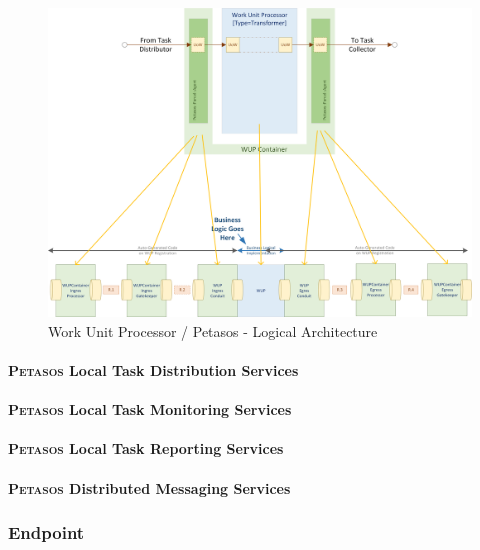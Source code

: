 \documentclass[a4paper]{book}
\begin{document}
\begin{figure}[h!]
	\begin{adjustbox}{max size={0.98\textwidth}{0.9\textheight}, center}
		\includegraphics[]{diagrams/Petasos-WUP.png}
	\end{adjustbox}
	\caption{Work Unit Processor / Petasos - Logical Architecture}
\end{figure}



\paragraph{\textsc{Petasos} Local Task Distribution Services}

\paragraph{\textsc{Petasos} Local Task Monitoring Services}

\paragraph{\textsc{Petasos} Local Task Reporting Services}

\paragraph{\textsc{Petasos} Distributed Messaging Services}

\subsubsection{Endpoint}
\end{document}

